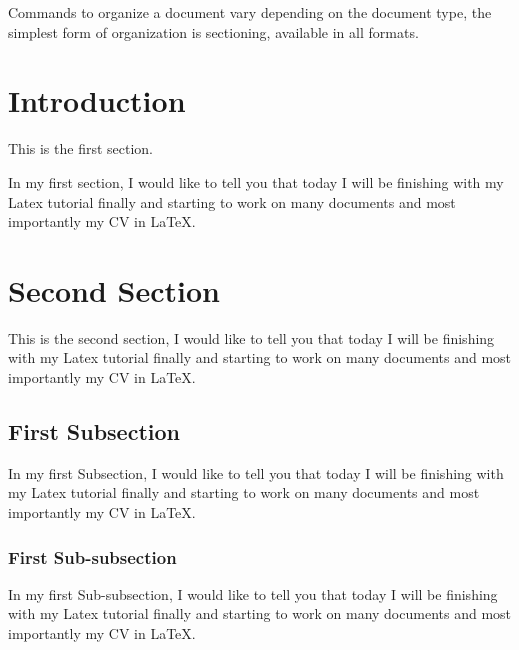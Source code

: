 \documentclass[12pt, letterpaper, twoside]{article}
\begin{document}

Commands to organize a document vary depending on the document type, the simplest form of organization is sectioning, available in all formats. 



\section{Introduction} 
This is the first section.

In my first section, I would like to tell you that today I will be finishing with my Latex tutorial finally and starting to work on many documents and most importantly my CV in \LaTeX.

\section{Second Section}
This is the second section, I would like to tell you that today I will be finishing with my Latex tutorial finally and starting to work on many documents and most importantly my CV in \LaTeX.

\subsection{First Subsection}
In my first Subsection, I would like to tell you that today I will be finishing with my Latex tutorial finally and starting to work on many documents and most importantly my CV in \LaTeX.

\subsubsection{First Sub-subsection}
In my first Sub-subsection, I would like to tell you that today I will be finishing with my Latex tutorial finally and starting to work on many documents and most importantly my CV in \LaTeX.
\end{document}

